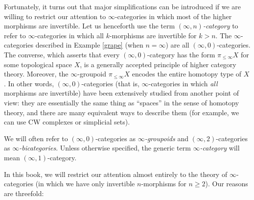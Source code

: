 Fortunately, it turns out that major simplifications can be
introduced if we are willing to restrict our attention to
$\infty$-categories in which most of the higher morphisms are
invertible. Let us henceforth use the term {\it $(\infty,n)$-category}
to refer to $\infty$-categories in which all $k$-morphisms are
invertible for $k > n$. The $\infty$-categories described in
Example \ref{grape} (when $n=\infty$) are all
$(\infty,0)$-categories. The converse, which asserts that every
$(\infty,0)$-category has the form $\pi_{\leq \infty} X$ for some
topological space $X$, is a generally accepted principle of higher
category theory. Moreover, the $\infty$-groupoid $\pi_{\leq \infty} X$ encodes the entire homotopy type of $X$. In other words, $(\infty,0)$-categories (that is,
$\infty$-categories in which {\em all} morphisms are invertible)
have been extensively studied from another point of view: they are
essentially the same thing as ``spaces'' in the sense of homotopy
theory, and there are many equivalent ways to describe them (for
example, we can use CW complexes or simplicial sets).

\begin{convention}
We will often refer to $(\infty,0)$-categories as {\it $\infty$-groupoids} and $(\infty,2)$-categories as {\it $\infty$-bicategories}. Unless otherwise specified, the generic term {\it $\infty$-category} will mean $(\infty,1)$-category. 
\end{convention}

In this book, we will restrict our attention almost entirely to the theory of $\infty$-categories (in which we have only invertible $n$-morphisms for $n \geq 2$). Our reasons are threefold:

